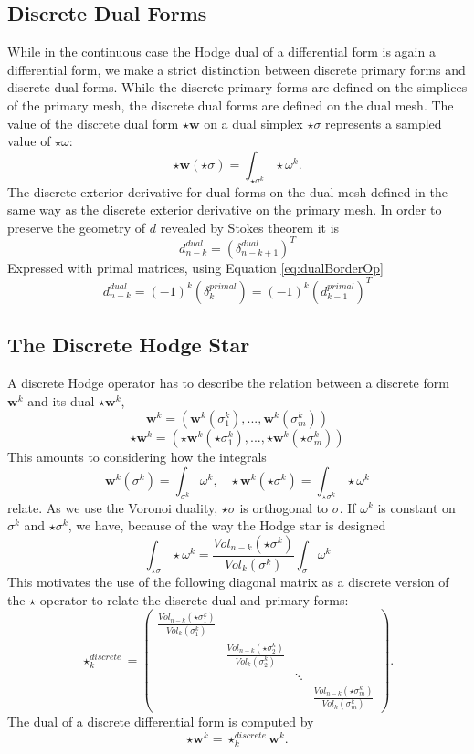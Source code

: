 \subsection{Discrete Dual Forms}
While in the continuous case the Hodge dual of a differential form is again a differential form, we make a strict distinction between discrete primary forms and discrete dual forms. While the discrete primary forms are defined on the simplices of the primary mesh, the discrete dual forms are defined on the dual mesh.
The value of the discrete dual form $\star \textbf{w}$ on a dual simplex $\star \sigma$ represents a sampled value of $\star \omega$:
\begin{equation}\star \textbf{w}(\star \sigma) = \int_{\star \sigma^k}  \star \omega^k. \label{eq:dualSampling}\end{equation}
The discrete exterior derivative for dual forms on the dual mesh defined in the same way as the discrete exterior derivative on the primary mesh. In order to preserve the geometry of $d$ revealed by Stokes theorem it is
\[d^{dual}_{n-k} = (\delta^{dual}_{n-k+1})^T \]
Expressed with primal matrices, using Equation \ref{eq:dualBorderOp}
\begin{equation}d^{dual}_{n-k}= (-1)^k(\delta_k^{primal}) = (-1)^k(d^{primal}_{k-1})^T \label{eq:dualDerivative}\end{equation}


\subsection{The Discrete Hodge Star}
A discrete Hodge operator has to describe the relation between a discrete form $\textbf{w}^k$ and its dual $\star \textbf{w}^k$, 
\[\textbf{w}^k = (\textbf{w}^k(\sigma^k_1),...,\textbf{w}^k(\sigma^k_m))\]
\[\star\textbf{w}^k  = (\star\textbf{w}^k(\star\sigma^k_1),...,\star\textbf{w}^k(\star\sigma^k_m))\]
This amounts to considering how the integrals
\[\textbf{w}^k(\sigma^k) =\int_{\sigma^k} \omega^k ,\;\;\; \star\textbf{w}^k(\star\sigma^k) = \int_{\star \sigma^k} \star \omega^k\]
relate. As we use the Voronoi duality, $\star \sigma$ is orthogonal to $\sigma$. If $\omega^k$ is constant on $\sigma^k$ and $\star \sigma^k$, we have, because of the way the Hodge star is designed
\[\int_{\star\sigma} \star\omega^k =  \frac{Vol_{n-k}(\star \sigma^k)}{Vol_k(\sigma^k)}\int_{\sigma} \omega^k\]
This motivates the use of the following diagonal matrix as a discrete version of the $\star$ operator to relate the discrete dual and primary forms:
\[\star^{discrete}_k = \begin{pmatrix}
\frac{Vol_{n-k}(\star \sigma^k_1)}{Vol_k(\sigma_1^k)} \\
&\frac{Vol_{n-k}(\star \sigma_2^k)}{Vol_k(\sigma_2^k)} \\
& & \ddots \\
& & & \frac{Vol_{n-k}(\star \sigma_m^k)}{Vol_k(\sigma_m^k)}
\end{pmatrix}.\]
The dual of a discrete differential form is computed by
\[\star \textbf{w}^k = \star^{discrete}_k \textbf{w}^k.\]

